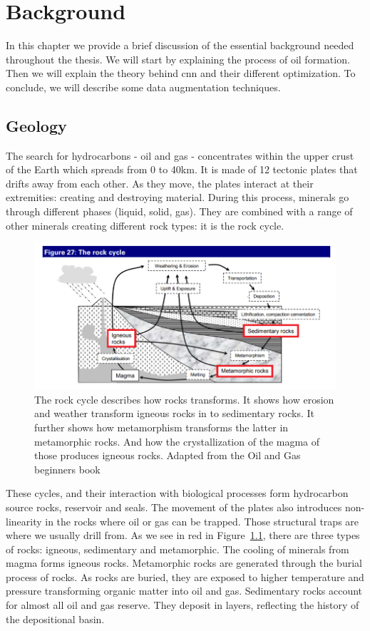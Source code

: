 \chapter{Background}
\label{chp:background}

In this chapter we provide a brief discussion of the essential background needed throughout the thesis. We will start by explaining the process of oil formation. Then we will explain the theory behind \gls{cnn} and their different optimization. To conclude, we will describe some data augmentation techniques.


\section{Geology}
The search for hydrocarbons - oil and gas - concentrates within the upper crust of the Earth which spreads from 0 to 40km. It is made of 12 tectonic plates that drifts away from each other. As they move, the plates interact at their extremities: creating and destroying material. During this process, minerals go through different phases (liquid, solid, gas). They are combined with a range of other minerals creating different rock types: it is the rock cycle. 
	\begin{figure}[!htp]
    \centering
        \includegraphics[width=1\textwidth]{figures/02-rock-cycle}
        \caption[The rock cycle]{The rock cycle describes how rocks transforms. It shows how erosion and weather transform igneous rocks in to sedimentary rocks. It further shows how metamorphism transforms the latter in metamorphic rocks. And how the crystallization of the magma of those produces igneous rocks. Adapted from the Oil and Gas beginners book \cite{oilbegin} }\label{fig:rock-cycle}
    \end{figure}

These cycles, and their interaction with biological processes form hydrocarbon source rocks, reservoir and seals. The movement of the plates also introduces non-linearity in the rocks where oil or gas can be trapped. Those structural traps are where we usually drill from. As we see in red in Figure~\ref{fig:rock-cycle}, there are three types of rocks: igneous, sedimentary and metamorphic. The cooling of minerals from magma  forms  igneous rocks. Metamorphic rocks are generated through  the burial process of rocks. As rocks are buried, they are exposed to higher temperature and pressure transforming organic matter into oil and gas. Sedimentary rocks account for almost all oil and gas reserve. They deposit in layers, reflecting the history of the depositional basin.


